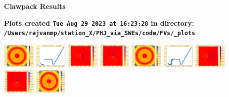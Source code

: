 \documentclass[11pt]{article}
\begin{document}
        \begin{center}{\Large\bf Clawpack Results}\vskip 5pt
        
        \bf Plots created {\tt Tue Aug 29 2023 at 16:23:28} in directory: \vskip 5pt
        \verb+/Users/rajvanmp/station_X/PHJ_via_SWEs/code/FVs/_plots+
        \end{center}
        \vskip 5pt
        \includegraphics[width=0.11875\textwidth]{frame0000fig0.png}
\includegraphics[width=0.11875\textwidth]{frame0000fig1.png}
\includegraphics[width=0.11875\textwidth]{frame0000fig2.png}
\includegraphics[width=0.11875\textwidth]{frame0000fig3.png}
\includegraphics[width=0.11875\textwidth]{frame0001fig0.png}
\includegraphics[width=0.11875\textwidth]{frame0001fig1.png}
\includegraphics[width=0.11875\textwidth]{frame0001fig2.png}
\includegraphics[width=0.11875\textwidth]{frame0001fig3.png}
\vskip 10pt 
\includegraphics[width=0.11875\textwidth]{frame0002fig0.png}
\end{document}
